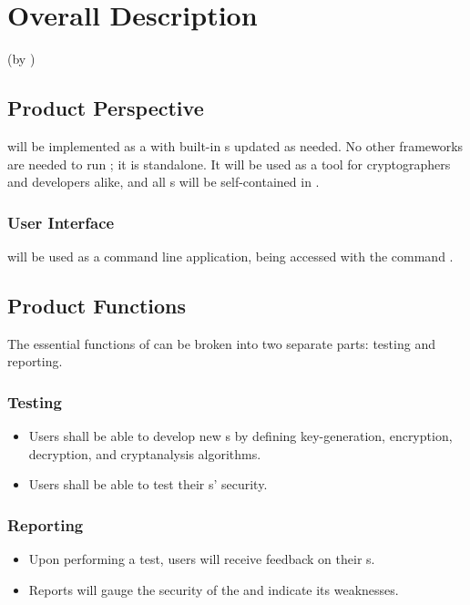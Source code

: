 \section{Overall Description}
(by \dd)


\subsection{Product Perspective}

\cry{} will be implemented as a \cf{} with built-in \cs s
updated as needed. No other frameworks are needed to run
\cry; it is standalone. It will be used as a
tool for cryptographers and developers alike, and all \cs s
will be self-contained in \cry.

\subsubsection{User Interface}
\cry{} will be used as a command line application, being
accessed with the command .


\subsection{Product Functions}

The essential functions of \cry{} can be broken into two
separate parts: testing and reporting.

\subsubsection{Testing}
\begin{itemize}
\item Users shall be able to develop new \cs s{}
  by defining key-generation, encryption, decryption,
  and cryptanalysis algorithms.
\item Users shall be able to test their \cs s' security.
\end{itemize}

\subsubsection{Reporting}
\begin{itemize}
\item Upon performing a test, users will receive feedback on
  their \cs s.
\item Reports will gauge the security of the
  \cs{} and indicate its weaknesses.
\end{itemize}

